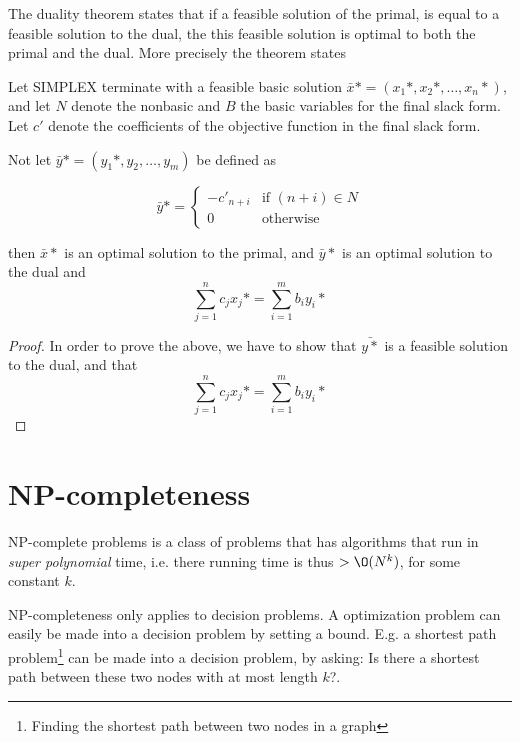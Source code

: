 \documentclass[10pt]{article}
\begin{document}
The duality theorem states that if a feasible solution of the primal, is equal to a feasible solution to the dual, the this feasible solution is optimal to both the primal and the dual. More precisely the theorem states

\begin{theorem}
Let SIMPLEX terminate with a feasible basic solution $\bar{x}*=(x_1*,x_2*,\ldots,x_n*)$, and let $N$ denote the nonbasic and $B$ the basic variables for the final slack form. Let $c'$ denote the coefficients of the objective function in the final slack form. 

Not let $\bar{y}* = (y_1*,y_2,\ldots,y_m)$ be defined as

\begin{equation} 
\bar{y}* = 
\left\{
\begin{array}{rl} 
  -c'_{n+i} & \text{if } (n+i) \in N \\
   0 & \text{otherwise}
\end{array} 
\right. 
\end{equation} 

then $\bar{x}*$ is an optimal solution to the primal, and $\bar{y}*$ is an optimal solution to the dual and
\begin{equation}
  \sum_{j=1}^n c_jx_j* = \sum_{i=1}^m b_iy_i*
\end{equation}
\end{theorem}

\begin{proof}
In order to prove the above, we have to show that $\bar{y*}$ is a feasible solution to the dual, and that 
\begin{equation}
  \sum_{j=1}^n c_jx_j* = \sum_{i=1}^m b_iy_i*  
\end{equation}
\end{proof}
 


\clearpage \newpage
\section{NP-completeness} %
\label{sec:np_completeness}

NP-complete problems is a class of problems that has algorithms that run in \emph{super polynomial} time, i.e. there running time is thus $>\O(N^k)$, for some constant $k$.

NP-completeness only applies to decision problems. A optimization problem can easily be made into a decision problem by setting a bound. E.g. a shortest path problem\footnote{Finding the shortest path between two nodes in a graph} can be made into a decision problem, by asking: Is there a shortest path between these two nodes with at most length $k$?.  
\end{document}
